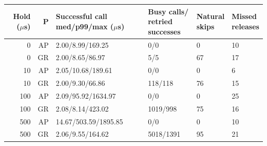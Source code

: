 \begin{tabular}{@{}rrllll@{}}
\toprule
\shortstack{Hold\\($\mu$s)} & P & \shortstack{Successful call\\med/p99/max ($\mu$s)} & \shortstack{Busy calls/\\retried successes} & \shortstack{Natural\\skips} & \shortstack{Missed\\releases} \\
\midrule
0 & AP & 2.00/8.99/169.25 & 0/0 & 0 & 10 \\
0 & GR & 2.00/8.65/86.97 & 5/5 & 67 & 17 \\
10 & AP & 2.05/10.68/189.61 & 0/0 & 0 & 6 \\
10 & GR & 2.00/9.30/66.86 & 118/118 & 76 & 15 \\
100 & AP & 2.09/95.92/1634.97 & 0/0 & 0 & 25 \\
100 & GR & 2.08/8.14/423.02 & 1019/998 & 75 & 16 \\
500 & AP & 14.67/503.59/1895.85 & 0/0 & 0 & 10 \\
500 & GR & 2.06/9.55/164.62 & 5018/1391 & 95 & 21 \\
\bottomrule
\end{tabular}

